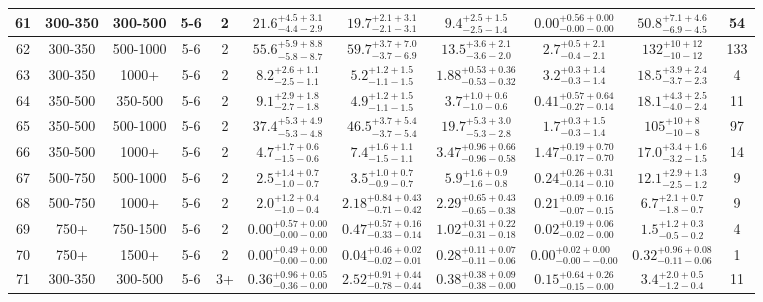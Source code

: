 \documentclass[11pt, oneside]{article}
\begin{document}
\begin{table}
{\begin{tabular}{ |c|c|c|c|c||c|c|c|c||c|c| }
61 & 300-350 & 300-500 & 5-6 & 2 & $21.6^{+4.5+3.1}_{-4.4-2.9}$ & $19.7^{+2.1+3.1}_{-2.1-3.1}$ & $9.4^{+2.5+1.5}_{-2.5-1.4}$ & $0.00^{+0.56+0.00}_{-0.00-0.00}$ & $50.8^{+7.1+4.6}_{-6.9-4.5}$ & 54 \\ \hline
62 & 300-350 & 500-1000 & 5-6 & 2 & $55.6^{+5.9+8.8}_{-5.8-8.7}$ & $59.7^{+3.7+7.0}_{-3.7-6.9}$ & $13.5^{+3.6+2.1}_{-3.6-2.0}$ & $2.7^{+0.5+2.1}_{-0.4-2.1}$ & $132^{+10+12}_{-10-12}$ & 133 \\ \hline
63 & 300-350 & 1000+ & 5-6 & 2 & $8.2^{+2.6+1.1}_{-2.5-1.1}$ & $5.2^{+1.2+1.5}_{-1.1-1.5}$ & $1.88^{+0.53+0.36}_{-0.53-0.32}$ & $3.2^{+0.3+1.4}_{-0.3-1.4}$ & $18.5^{+3.9+2.4}_{-3.7-2.3}$ & 4 \\ \hline
64 & 350-500 & 350-500 & 5-6 & 2 & $9.1^{+2.9+1.8}_{-2.7-1.8}$ & $4.9^{+1.2+1.5}_{-1.1-1.5}$ & $3.7^{+1.0+0.6}_{-1.0-0.6}$ & $0.41^{+0.57+0.64}_{-0.27-0.14}$ & $18.1^{+4.3+2.5}_{-4.0-2.4}$ & 11 \\ \hline
65 & 350-500 & 500-1000 & 5-6 & 2 & $37.4^{+5.3+4.9}_{-5.3-4.8}$ & $46.5^{+3.7+5.4}_{-3.7-5.4}$ & $19.7^{+5.3+3.0}_{-5.3-2.8}$ & $1.7^{+0.3+1.5}_{-0.3-1.4}$ & $105^{+10+ 8}_{-10- 8}$ & 97 \\ \hline
66 & 350-500 & 1000+ & 5-6 & 2 & $4.7^{+1.7+0.6}_{-1.5-0.6}$ & $7.4^{+1.6+1.1}_{-1.5-1.1}$ & $3.47^{+0.96+0.66}_{-0.96-0.58}$ & $1.47^{+0.19+0.70}_{-0.17-0.70}$ & $17.0^{+3.4+1.6}_{-3.2-1.5}$ & 14 \\ \hline
67 & 500-750 & 500-1000 & 5-6 & 2 & $2.5^{+1.4+0.7}_{-1.0-0.7}$ & $3.5^{+1.0+0.7}_{-0.9-0.7}$ & $5.9^{+1.6+0.9}_{-1.6-0.8}$ & $0.24^{+0.26+0.31}_{-0.14-0.10}$ & $12.1^{+2.9+1.3}_{-2.5-1.2}$ & 9 \\ \hline
68 & 500-750 & 1000+ & 5-6 & 2 & $2.0^{+1.2+0.4}_{-1.0-0.4}$ & $2.18^{+0.84+0.43}_{-0.71-0.42}$ & $2.29^{+0.65+0.43}_{-0.65-0.38}$ & $0.21^{+0.09+0.16}_{-0.07-0.15}$ & $6.7^{+2.1+0.7}_{-1.8-0.7}$ & 9 \\ \hline
69 & 750+ & 750-1500 & 5-6 & 2 & $0.00^{+0.57+0.00}_{-0.00-0.00}$ & $0.47^{+0.57+0.16}_{-0.33-0.14}$ & $1.02^{+0.31+0.22}_{-0.31-0.18}$ & $0.02^{+0.19+0.06}_{-0.02-0.00}$ & $1.5^{+1.2+0.3}_{-0.5-0.2}$ & 4 \\ \hline
70 & 750+ & 1500+ & 5-6 & 2 & $0.00^{+0.49+0.00}_{-0.00-0.00}$ & $0.04^{+0.46+0.02}_{-0.02-0.01}$ & $0.28^{+0.11+0.07}_{-0.11-0.06}$ & $0.00^{+0.02+0.00}_{-0.00--0.00}$ & $0.32^{+0.96+0.08}_{-0.11-0.06}$ & 1 \\ \hline
71 & 300-350 & 300-500 & 5-6 & 3+ & $0.36^{+0.96+0.05}_{-0.36-0.00}$ & $2.52^{+0.91+0.44}_{-0.78-0.44}$ & $0.38^{+0.38+0.09}_{-0.38-0.00}$ & $0.15^{+0.64+0.26}_{-0.15-0.00}$ & $3.4^{+2.0+0.5}_{-1.2-0.4}$ & 11 \\ \hline

\end{tabular}}
\end{table}
\end{document}
